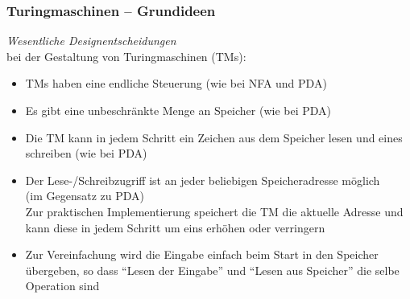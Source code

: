 \documentclass[aspectratio=1610,onlymath]{beamer}
\begin{document}
\begin{frame}\frametitle{Turingmaschinen -- Grundideen}

\emph{Wesentliche Designentscheidungen}\\
bei der Gestaltung von Turingmaschinen (TMs)\pause:
\begin{itemize}
\item TMs haben eine \alert{endliche Steuerung} (wie bei NFA und PDA)\pause
\item Es gibt eine \alert{unbeschränkte Menge an Speicher} (wie bei PDA)\pause
\item Die TM kann in jedem Schritt \alert{ein Zeichen} aus dem Speicher \alert{lesen} und eines \alert{schreiben} (wie bei PDA)\pause
\item Der Lese-/Schreibzugriff ist \alert{an jeder beliebigen Speicheradresse} möglich\\ (im Gegensatz zu PDA)\\[1ex]

Zur praktischen Implementierung speichert die TM die aktuelle Adresse und kann diese in jedem
Schritt um eins erhöhen oder verringern\pause
\item Zur Vereinfachung wird die Eingabe einfach beim Start in den Speicher übergeben, so dass 
"`Lesen der Eingabe"' und "`Lesen aus Speicher"' die selbe Operation sind
\end{itemize}

\end{frame}
\end{document}
